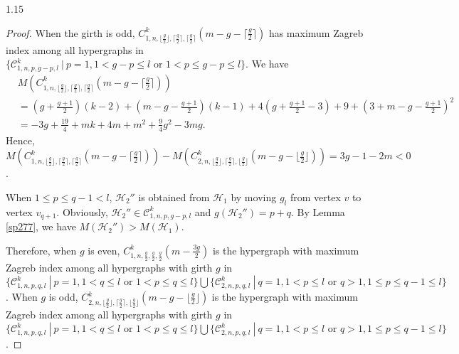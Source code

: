 \documentclass[preprint,12pt]{elsarticle1}
\numberwithin{equation}{section}
\begin{document}
\begin{spacing}{1.15}
\begin{proof}
When the girth is odd, $C_{1,n,\lfloor\frac{g}{2}\rfloor,\lceil\frac{g}{2}\rceil,\lceil\frac{g}{2}\rceil}^{k}(m-g-\lceil\frac{g}{2}\rceil)$ has maximum Zagreb index among all  hypergraphs  in $\{\mathcal{C}_{1,n,p,g-p,l}^{k}~|~ p=1,1<g-p\leq l \text{~or~} 1<p\leq g-p\leq l\}$. We have
\begin{align*}
&M(C_{1,n,\lfloor\frac{g}{2}\rfloor,\lceil\frac{g}{2}\rceil,\lceil\frac{g}{2}\rceil}^{k}(m-g-\lceil\frac{g}{2}\rceil))\\
&=(g+\frac{g+1}{2})(k-2)+(m-g-\frac{g+1}{2})(k-1)+4(g+\frac{g+1}{2}-3)+9+(3+m-g-\frac{g+1}{2})^{2}\\
&=-3g+\frac{19}{4}+mk+4m+m^{2}+\frac{9}{4}g^{2}-3mg.
\end{align*}
Hence, $M(C_{1,n,\lfloor\frac{g}{2}\rfloor,\lceil\frac{g}{2}\rceil,\lceil\frac{g}{2}\rceil}^{k}(m-g-\lceil\frac{g}{2}\rceil))-M(C_{2,n,\lfloor\frac{g}{2}\rfloor,\lceil\frac{g}{2}\rceil,\lfloor\frac{g}{2}\rfloor}^{k}(m-g-\lfloor\frac{g}{2}\rfloor))=3g-1-2m<0$.

When $1\leq p\leq q-1<l$,
$\mathcal{H}_{2}''$ is obtained from $\mathcal{H}_{1}$ by moving $g_{l}$
from vertex $v$ to vertex $v_{q+1}$. Obviously, $\mathcal{H}_{2}''\in \mathcal{C}_{1,n,p,g-p,l}^{k}$ and $g(\mathcal{H}_{2}'')=p+q$. By Lemma \ref{sp277}, we have $ M(\mathcal{H}_{2}'')>M(\mathcal{H}_{1})$.



Therefore,
when $g$ is even, $C_{1,n,\frac{g}{2},\frac{g}{2},\frac{g}{2}}^{k}(m-\frac{3g}{2})$ is the hypergraph with maximum Zagreb index among all hypergraphs with girth $g$ in $\{\mathcal{C}_{1,n,p,q,l}^{k} ~|~ p=1,1<q\leq l \text{~or~} 1<p\leq q\leq l\} \bigcup \{\mathcal{C}_{2,n,p,q,l}^{k}~|~ q=1,1<p\leq l \text{~or~} q>1, 1\leq p\leq q-1\leq l\}$. When $g$ is odd, $C_{2,n,\lfloor\frac{g}{2}\rfloor,\lceil\frac{g}{2}\rceil,\lfloor\frac{g}{2}\rfloor}^{k}(m-g-\lfloor\frac{g}{2}\rfloor)$ is the hypergraph with maximum Zagreb index among all hypergraphs with girth $g$ in $\{\mathcal{C}_{1,n,p,q,l}^{k} ~|~ p=1,1<q\leq l \text{~or~} 1<p\leq q\leq l\} \bigcup \{\mathcal{C}_{2,n,p,q,l}^{k}~|~ q=1,1<p\leq l \text{~or~} q>1, 1\leq p\leq q-1\leq l\} $.


\end{proof}
\end{spacing}
\end{document}
